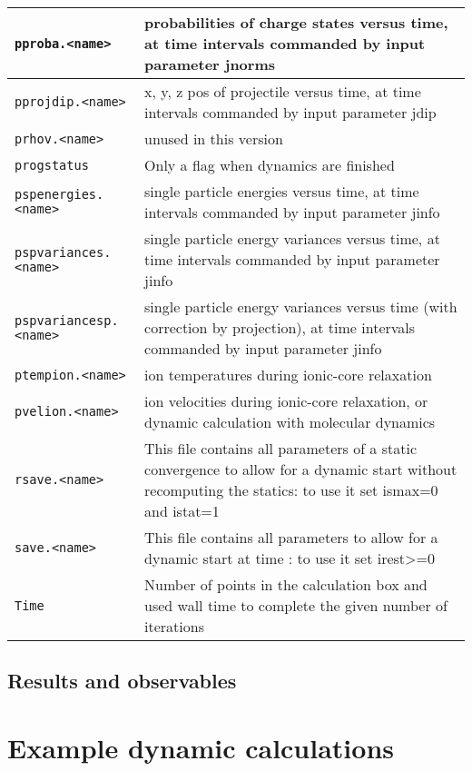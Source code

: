 \documentclass[11pt,a4paper]{article}
\begin{document}
\begin{table}[h!]
\begin{tabular}{|p{4.5cm}|p{10.2cm}|}
					\hline
					\texttt{pproba.<name>} & probabilities of charge states versus time, at time intervals commanded by input parameter jnorms\\
					\hline
					\texttt{pprojdip.<name>} & x, y, z pos of projectile versus time, at time intervals commanded by input parameter jdip\\
					\hline
					\texttt{prhov.<name>} & unused in this version\\
					\hline
					\texttt{progstatus} & Only a flag when dynamics are finished\\
					\hline
					\texttt{pspenergies.<name>} & single particle energies versus time, at time intervals commanded by input parameter jinfo\\
					\hline
					\texttt{pspvariances.<name>} & single particle energy variances versus time, at time intervals commanded by input parameter jinfo\\
					\hline
					\texttt{pspvariancesp.<name>} & single particle energy variances versus time (with correction by projection), at time intervals commanded by input parameter jinfo \\
					\hline
					\texttt{ptempion.<name>} & ion temperatures during ionic-core relaxation\\
					\hline
					\texttt{pvelion.<name>} & ion velocities during ionic-core relaxation, or dynamic calculation with molecular dynamics\\
					\hline
					\texttt{rsave.<name>} & This file contains all parameters of a static convergence to allow for a dynamic start without recomputing the statics: to use it set ismax=0 and istat=1  \\
					\hline
					\texttt{save.<name>} & This file contains all parameters to allow for a dynamic start at time : to use it set  irest>=0 \\
					\hline
					\texttt{Time} & Number of points in the calculation box and used wall time to complete the given number of iterations\\
					\hline
				\end{tabular}
			\end{table}

		\subsection{Results and observables}
			
	\section{Example dynamic calculations}
\end{document}
